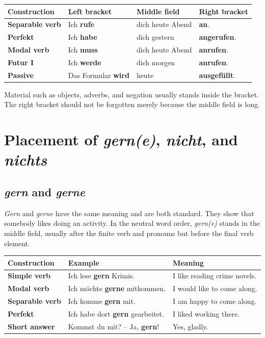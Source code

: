 \begin{center}
\small
{}
\begin{tabularx}{\textwidth}{@{}>{\bfseries}l l X l@{}}
\toprule
Construction & Left bracket & Middle field & Right bracket \\
\midrule
Separable verb & Ich \textbf{rufe} & dich heute Abend & \textbf{an}. \\
Perfekt & Ich \textbf{habe} & dich gestern & \textbf{angerufen}. \\
Modal verb & Ich \textbf{muss} & dich heute Abend & \textbf{anrufen}. \\
Futur I & Ich \textbf{werde} & dich morgen & \textbf{anrufen}. \\
Passive & Das Formular \textbf{wird} & heute & \textbf{ausgefüllt}. \\
\bottomrule
\end{tabularx}
\end{center}

Material such as objects, adverbs, and negation usually stands inside the
bracket. The right bracket should not be forgotten merely because the middle
field is long.

\section{Placement of \textit{gern(e)}, \textit{nicht}, and \textit{nichts}}

\subsection{\textit{gern} and \textit{gerne}}

\textit{Gern} and \textit{gerne} have the same meaning and are both standard.
They show that somebody likes doing an activity. In the neutral word order,
\textit{gern(e)} stands in the middle field, usually after the finite verb and
pronouns but before the final verb element.

\begin{center}
\small
{}
\begin{tabularx}{\textwidth}{@{}>{\bfseries}l X l@{}}
\toprule
Construction & Example & Meaning \\
\midrule
Simple verb & Ich lese \textbf{gern} Krimis. & I like reading crime novels. \\
Modal verb & Ich möchte \textbf{gerne} mitkommen. & I would like to come along. \\
Separable verb & Ich komme \textbf{gern} mit. & I am happy to come along. \\
Perfekt & Ich habe dort \textbf{gern} gearbeitet. & I liked working there. \\
Short answer & Kommst du mit? -- Ja, \textbf{gern}! & Yes, gladly. \\
\bottomrule
\end{tabularx}
\end{center}

